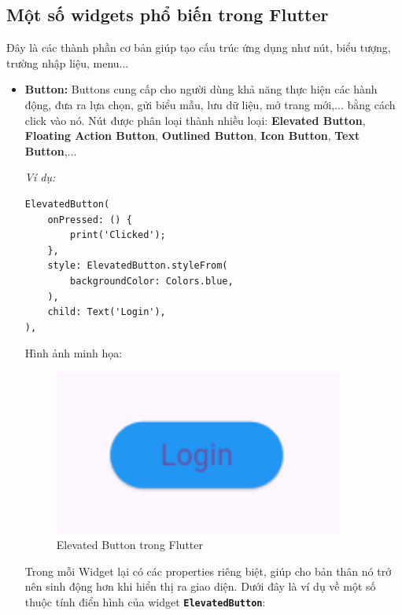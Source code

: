 \documentclass[../DoAn.tex]{subfiles}
\numberwithin{figure}{chapter}
\begin{document}
\subsection{Một số widgets phổ biến trong Flutter}
Đây là các thành phần cơ bản giúp tạo cấu trúc ứng dụng như nút, biểu tượng, trường nhập liệu, menu...
\begin{itemize}
\item \textbf{Button: } Buttons cung cấp cho người dùng khả năng thực hiện các hành động, đưa ra lựa chọn, gửi biểu mẫu, lưu dữ liệu, mở trang mới,... bằng cách click vào nó. Nút được phân loại thành nhiều loại: \textbf{Elevated Button}, \textbf{Floating Action Button}, \textbf{Outlined Button}, \textbf{Icon Button}, \textbf{Text Button},...

\textit{Ví dụ:}
\begin{lstlisting}
ElevatedButton(
    onPressed: () {
        print('Clicked'); 
    },
    style: ElevatedButton.styleFrom(
        backgroundColor: Colors.blue, 
    ),
    child: Text('Login'),
),
\end{lstlisting}

Hình ảnh minh họa:
\begin{figure}[H]
    \centering
    \includegraphics[width=0.9\textwidth]{Hinhve/Chuong5/buttonWidget.png}
    \caption{Elevated Button trong Flutter}
    \label{fig:buttonwidget}
\end{figure}

Trong mỗi Widget lại có các properties riêng biệt, giúp cho bản thân nó trở nên sinh động hơn khi hiển thị ra giao diện. Dưới đây là ví dụ về một số thuộc tính điển hình của widget \textbf{\texttt{ElevatedButton}}:


\end{itemize}
\end{document}
